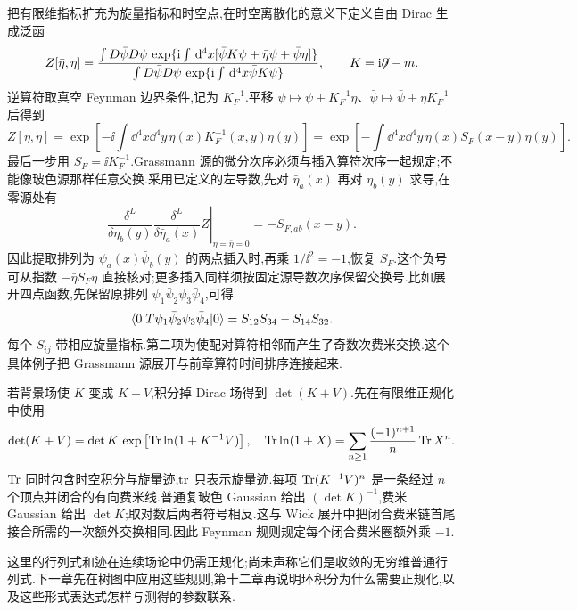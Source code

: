 把有限维指标扩充为旋量指标和时空点,在时空离散化的意义下定义自由 Dirac 生成泛函
\begin{equation}
 Z[\bar\eta,\eta]=\frac{\int D\bar\psi D\psi\,
 \exp\{\mathrm i\int\,\mathrm d^4x[\bar\psi K\psi+\bar\eta\psi+\bar\psi\eta]\}}
 {\int D\bar\psi D\psi\,\exp\{\mathrm i\int\,\mathrm d^4x\bar\psi K\psi\}},
 \qquad K=\mathrm i\mathord{\not\mathrel{\partial}}-m.
\end{equation}
逆算符取真空 Feynman 边界条件,记为 $K_F^{-1}$.平移 $\psi\mapsto\psi+K_F^{-1}\eta$、$\bar\psi\mapsto\bar\psi+\bar\eta K_F^{-1}$ 后得到
\begin{equation}
 Z[\bar\eta,\eta]
 =\exp\!\left[-\ii\int\dd^4x\dd^4y\,
       \bar\eta(x)K_F^{-1}(x,y)\eta(y)\right]
 =\exp\!\left[-\int\dd^4x\dd^4y\,\bar\eta(x)S_F(x-y)\eta(y)\right].
\end{equation}
最后一步用 $S_F=\ii K_F^{-1}$.Grassmann 源的微分次序必须与插入算符次序一起规定;不能像玻色源那样任意交换.采用已定义的左导数,先对 $\bar\eta_a(x)$ 再对 $\eta_b(y)$ 求导,在零源处有
\begin{equation}
 \left.\frac{\delta^L}{\delta\eta_b(y)}\frac{\delta^L}{\delta\bar\eta_a(x)}Z\right|_{\eta=\bar\eta=0}=-S_{F,ab}(x-y).
\end{equation}
因此提取排列为 $\psi_a(x)\bar\psi_b(y)$ 的两点插入时,再乘 $1/\ii^2=-1$,恢复 $S_F$.这个负号可从指数 $-\bar\eta S_F\eta$ 直接核对;更多插入同样须按固定源导数次序保留交换号.比如展开四点函数,先保留原排列 $\psi_1\bar\psi_2\psi_3\bar\psi_4$,可得
\begin{equation}
 \langle 0\rvert T\psi_1\bar\psi_2\psi_3\bar\psi_4\lvert 0\rangle
 =S_{12}S_{34}-S_{14}S_{32}.
 \label{eq:fermion-wick-four}
\end{equation}
每个 $S_{ij}$ 带相应旋量指标.第二项为使配对算符相邻而产生了奇数次费米交换.这个具体例子把 Grassmann 源展开与前章算符时间排序连接起来.


若背景场使 $K$ 变成 $K+V$,积分掉 Dirac 场得到 $\det(K+V)$.先在有限维正规化中使用
\begin{equation}
 \det(K+V)=\det K\,
 \exp\left[\operatorname{Tr}\ln(1+K^{-1}V)\right],
 \quad
 \operatorname{Tr}\ln(1+X)=\sum_{n\geq1}\frac{(-1)^{n+1}}n\operatorname{Tr} X^n.
\end{equation}
$\operatorname{Tr}$ 同时包含时空积分与旋量迹,$\operatorname{tr}$ 只表示旋量迹.每项 $\operatorname{Tr}(K^{-1}V)^n$ 是一条经过 $n$ 个顶点并闭合的有向费米线.普通复玻色 Gaussian 给出 $(\det K)^{-1}$,费米 Gaussian 给出 $\det K$;取对数后两者符号相反.这与 Wick 展开中把闭合费米链首尾接合所需的一次额外交换相同.因此 Feynman 规则规定每个闭合费米圈额外乘 $-1$.

这里的行列式和迹在连续场论中仍需正规化;尚未声称它们是收敛的无穷维普通行列式.下一章先在树图中应用这些规则,第十二章再说明环积分为什么需要正规化,以及这些形式表达式怎样与测得的参数联系.
